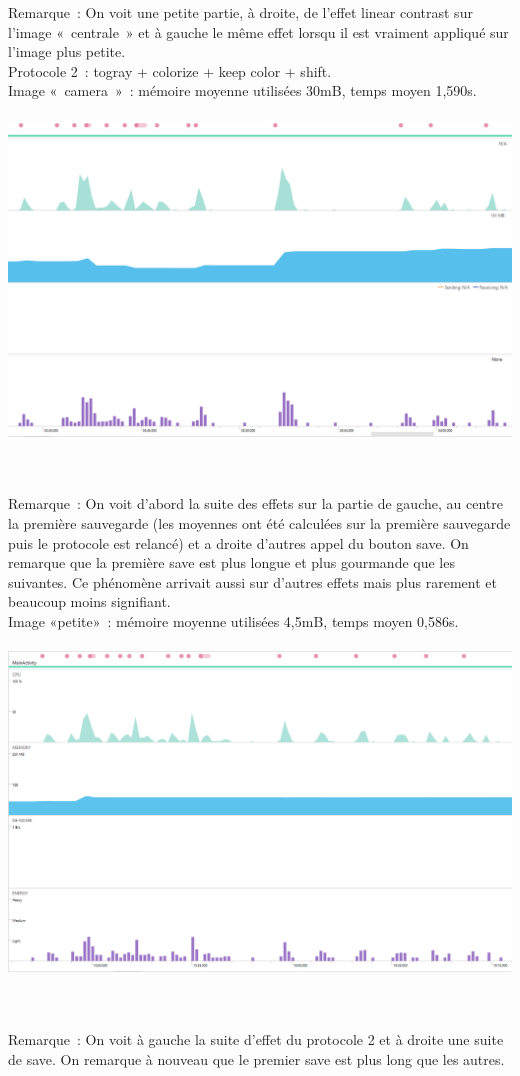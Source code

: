 \documentclass[12pt]{article}
\begin{document}
    Remarque :
    On voit une petite partie, à droite, de l’effet linear contrast sur l’image « centrale » et à gauche le même effet lorsqu il est vraiment appliqué sur l’image plus petite.\\


    Protocole 2 : togray + colorize + keep color + shift.\\

    Image « camera » : mémoire moyenne utilisées 30mB, temps moyen 1,590s.\\


\\

    \includegraphics{camera-serie}

\\

\\

    Remarque :
    On voit d’abord la suite des effets sur la partie de gauche, au centre la première sauvegarde (les moyennes ont été calculées sur la première sauvegarde puis le protocole est relancé) et a droite d’autres appel du bouton save. On remarque que la première save est plus longue et plus gourmande  que les suivantes. Ce phénomène arrivait aussi sur d’autres effets mais plus rarement et beaucoup moins signifiant.\\


    Image «petite» : mémoire moyenne utilisées 4,5mB, temps moyen 0,586s.\\



\\
    \includegraphics{petite-serie}


\\
\\


    Remarque :
    On voit à gauche la suite d’effet du protocole 2 et à droite une suite de save. On remarque à nouveau que le premier save est plus long que les autres.\\
\end{document}
